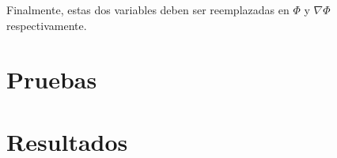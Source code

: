 Finalmente, estas dos variables deben ser reemplazadas en $\Phi$ y $\nabla \Phi$ respectivamente.









\chapter{Pruebas}
\label{cap:pruebas}

\chapter{Resultados}
\label{cap:resultados}
